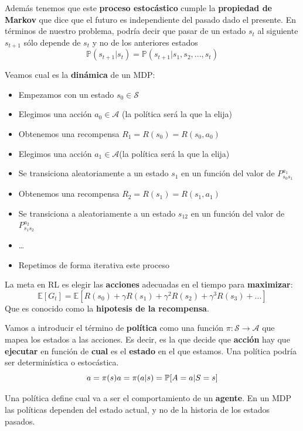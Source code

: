 \documentclass[
  a4paper,
  DIV=11,
  numbers=noendperiod]{scrreprt}
\providecommand{\tightlist}{%
  \setlength{\itemsep}{0pt}\setlength{\parskip}{0pt}}\usepackage{longtable,booktabs,array}
\begin{document}
Además tenemos que este \textbf{proceso estocástico} cumple la
\textbf{propiedad de Markov} que dice que el futuro es independiente del
pasado dado el presente. En términos de nuestro problema, podría decir
que pasar de un estado \(s_t\) al siguiente \(s_{t+1}\) sólo depende de
\(s_t\) y no de los anteriores estados \[
\mathbb P(s_{t+1}|s_t)= \mathbb P(s_{t+1}|s_1,s_2,...,s_t)
\]

Veamos cual es la \textbf{dinámica} de un MDP:

\begin{itemize}
\tightlist
\item
  Empezamos con un estado \(s_0 \in \mathcal S\)
\item
  Elegimos una acción \(a_0 \in \mathcal A\) (la política será la que la
  elija)
\item
  Obtenemos una recompensa \(R_1 = R(s_0) = R(s_0, a_0)\)
\item
  Elegimos una acción \(a_1 \in \mathcal A\)(la política será la que la
  elija)
\item
  Se transiciona aleatoriamente a un estado \(s_1\) en un función del
  valor de \(P_{s_0s_1}^{a_1}\)
\item
  Obtenemos una recompensa \(R_2 = R(s_1) = R(s_1, a_1)\)
\item
  Se transiciona a aleatoriamente a un estado \(s_12\) en un función del
  valor de \(P_{s_1s_2}^{a_2}\)
\item
  \ldots{}
\item
  Repetimos de forma iterativa este proceso
\end{itemize}

La meta en RL es elegir las \textbf{acciones} adecuadas en el tiempo
para \textbf{maximizar}:
\[\mathbb E[G_t] =\mathbb E[R(s_0) + \gamma R(s_1) + \gamma^2 R(s_2) + \gamma^3 R(s_3) + ...]\]
Que es conocido como la \textbf{hipotesis de la recompensa}.

Vamos a introducir el término de \textbf{política} como una función
\(\pi : \mathcal S \rightarrow \mathcal A\) que mapea los estados a las
acciones. Es decir, es la que decide que \textbf{acción} hay que
\textbf{ejecutar} en función de \textbf{cual} es el \textbf{estado} en
el que estamos. Una política podría ser determinística o estocástica. \[
a = \pi(s) \\
a = \pi (a|s)=\mathbb P[A=a|S=s]
\]

Una política define cual va a ser el comportamiento de un
\textbf{agente}. En un MDP las políticas dependen del estado actual, y
no de la historia de los estados pasados.
\end{document}
